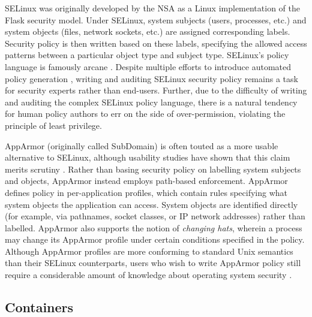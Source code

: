 SELinux \cite{smalley2001_selinux} was originally developed by the NSA as a Linux implementation of the Flask \cite{spencer1999_flask} security model.  Under SELinux, system subjects (users, processes, etc.) and system objects (files, network sockets, etc.) are assigned corresponding labels. Security policy is then written based on these labels, specifying the allowed access patterns between a particular object type and subject type. SELinux's policy language is famously arcane \cite{schreuders12_towards}. Despite multiple efforts to introduce automated policy generation \cite{audit2allow, macmillan07_madison, sniffen06_guided}, writing and auditing SELinux security policy remains a task for security experts rather than end-users. Further, due to the difficulty of writing and auditing the complex SELinux policy language, there is a natural tendency for human policy authors to err on the side of over-permission, violating the principle of least privilege.

AppArmor (originally called SubDomain) \cite{cowan2000_apparmor} is often touted as a more usable alternative to SELinux, although usability studies have shown that this claim merits scrutiny \cite{schreuders12_towards}. Rather than basing security policy on labelling system subjects and objects, AppArmor instead employs path-based enforcement. AppArmor defines policy in per-application profiles, which contain rules specifying what system objects the application can access. System objects are identified directly (for example, via pathnames, socket classes, or IP network addresses) rather than labelled.  AppArmor also supports the notion of \textit{changing hats}, wherein a process may change its AppArmor profile under certain conditions specified in the policy.  Although AppArmor profiles are more conforming to standard Unix semantics than their SELinux counterparts, users who wish to write AppArmor policy still require a considerable amount of knowledge about operating system security \cite{schreuders12_towards}.

\subsection{Containers}
\label{subsection:containers}

